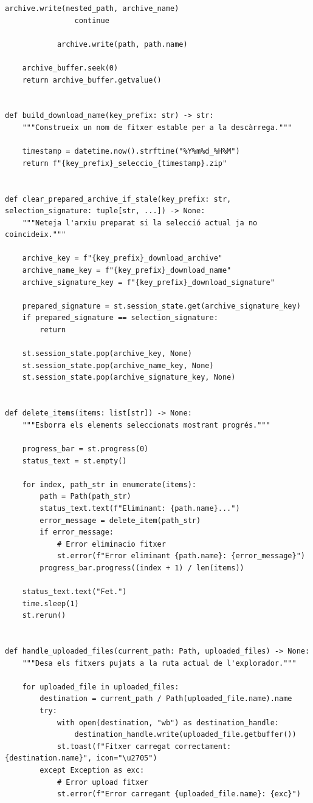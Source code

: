 \documentclass[10pt,a4paper]{article}
\begin{document}
\begin{lstlisting}[style=studioPython,caption={pages/Gestionar\_Arxius.py},label={lst:pages-gestionar-arxius-py}]
                    archive.write(nested_path, archive_name)
                continue

            archive.write(path, path.name)

    archive_buffer.seek(0)
    return archive_buffer.getvalue()


def build_download_name(key_prefix: str) -> str:
    """Construeix un nom de fitxer estable per a la descàrrega."""

    timestamp = datetime.now().strftime("%Y%m%d_%H%M")
    return f"{key_prefix}_seleccio_{timestamp}.zip"


def clear_prepared_archive_if_stale(key_prefix: str, selection_signature: tuple[str, ...]) -> None:
    """Neteja l'arxiu preparat si la selecció actual ja no coincideix."""

    archive_key = f"{key_prefix}_download_archive"
    archive_name_key = f"{key_prefix}_download_name"
    archive_signature_key = f"{key_prefix}_download_signature"

    prepared_signature = st.session_state.get(archive_signature_key)
    if prepared_signature == selection_signature:
        return

    st.session_state.pop(archive_key, None)
    st.session_state.pop(archive_name_key, None)
    st.session_state.pop(archive_signature_key, None)


def delete_items(items: list[str]) -> None:
    """Esborra els elements seleccionats mostrant progrés."""

    progress_bar = st.progress(0)
    status_text = st.empty()

    for index, path_str in enumerate(items):
        path = Path(path_str)
        status_text.text(f"Eliminant: {path.name}...")
        error_message = delete_item(path_str)
        if error_message:
            # Error eliminacio fitxer
            st.error(f"Error eliminant {path.name}: {error_message}")
        progress_bar.progress((index + 1) / len(items))

    status_text.text("Fet.")
    time.sleep(1)
    st.rerun()


def handle_uploaded_files(current_path: Path, uploaded_files) -> None:
    """Desa els fitxers pujats a la ruta actual de l'explorador."""

    for uploaded_file in uploaded_files:
        destination = current_path / Path(uploaded_file.name).name
        try:
            with open(destination, "wb") as destination_handle:
                destination_handle.write(uploaded_file.getbuffer())
            st.toast(f"Fitxer carregat correctament: {destination.name}", icon="\u2705")
        except Exception as exc:
            # Error upload fitxer
            st.error(f"Error carregant {uploaded_file.name}: {exc}")


\end{lstlisting}
\end{document}
